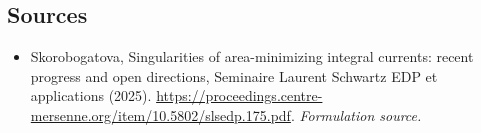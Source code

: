 \documentclass[11pt]{article}
\begin{document}
\subsection{Sources}
\begin{itemize}
\item[S1]Skorobogatova, Singularities of area-minimizing integral currents: recent progress and open directions, Seminaire Laurent Schwartz EDP et applications (2025).
\url{https://proceedings.centre-mersenne.org/item/10.5802/slsedp.175.pdf}.
\textit{Formulation source.}
\end{itemize}
\end{document}
